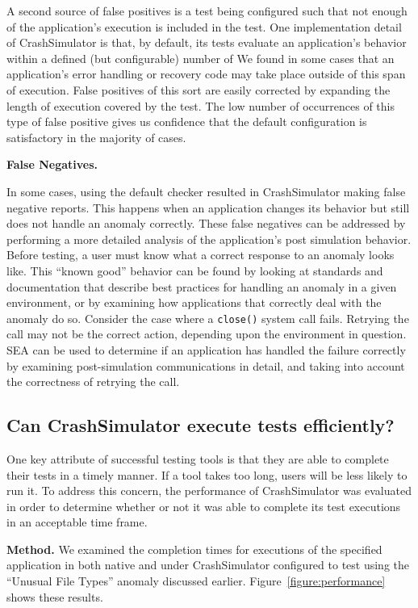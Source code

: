 A second source of false positives is a test being configured such that not
enough of the application's execution is included in the test.
One implementation detail of CrashSimulator is that,
by default,
its tests evaluate an application's behavior
within a defined (but configurable) number of
We found in some cases
that an application's error handling or recovery code
may take place outside of this span of execution.
False positives
of this sort
are easily corrected
by expanding the length of execution
covered by the test.
The low number of occurrences of this
type of false positive gives us confidence that the default configuration
is satisfactory in the majority of cases.

\textbf{False Negatives.}

In some cases,
using the default checker resulted
in CrashSimulator making false negative reports.
This happens when
an application changes its behavior
but still does not handle an anomaly correctly.
These false negatives can be addressed
by performing a more detailed analysis
of the application's post simulation behavior.
Before testing,
a user must know
what a correct response
to an anomaly looks like.
This ``known good'' behavior can be found
by looking at standards and documentation
that describe best practices for handling an anomaly
in a given environment,
or by examining how applications that correctly
deal with the anomaly do so.
Consider the case where a {\tt close()} system call fails.
Retrying the call may not be the correct action,
depending upon the environment in question.
SEA can be used to determine if an application
has handled the failure correctly
by examining post-simulation communications in detail,
and taking into account the correctness of retrying the call.

\subsection{Can CrashSimulator execute tests efficiently?}
\label{sec-perf}

One key attribute of successful testing tools is that they are able to
complete their tests in a timely manner.  If a tool takes too long,
users will be less likely to run it.
To address this concern, the performance of CrashSimulator was
evaluated in order to determine whether or not it was able to complete its
test executions in an acceptable time frame.

{\bf Method.} We examined the completion
times for executions of the specified application in both
native and under CrashSimulator configured to test using the ``Unusual File
Types'' anomaly discussed earlier.
Figure~\ref{figure:performance} shows these results.

